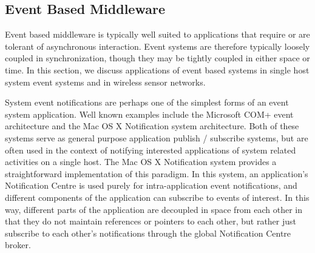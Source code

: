 \documentclass{acm_proc_article-sp}
\begin{document}




\subsection{Event Based Middleware}
\label{sec:appseb}


Event based middleware is typically well suited to applications that require or are tolerant of asynchronous interaction. Event systems are therefore typically loosely coupled in synchronization, though they may be tightly coupled in either space or time. In this section, we discuss applications of event based systems in single host system event systems and in wireless sensor networks.

System event notifications are perhaps one of the simplest forms of an event system application. Well known examples include the Microsoft COM+ event architecture and the Mac OS X Notification system architecture. Both of these systems serve as general purpose application publish / subscribe systems, but are often used in the context of notifying interested applications of system related activities on a single host. The Mac OS X Notification system \cite{nsnotification} provides a straightforward implementation of this paradigm. In this system, an application's Notification Centre is used purely for intra-application event notifications, and different components of the application can subscribe to events of interest. In this way, different parts of the application are decoupled in space from each other in that they do not maintain references or pointers to each other, but rather just subscribe to each other's notifications through the global Notification Centre broker. 
\end{document}
